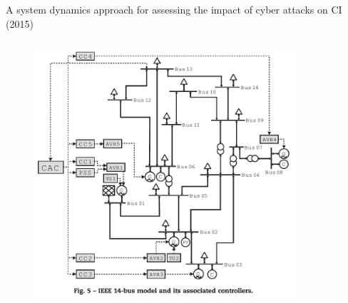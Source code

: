 \documentclass[compress]{beamer}
\begin{document}
\begin{frame}{A system dynamics approach for assessing the impact of cyber attacks on CI (2015)}
    \begin{columns}
     \begin{column}{0.55\textwidth}
      \begin{figure}
      \centering
      \includegraphics[width=1.0\textwidth]{./images/ieee-14-bus.png}
      \label{fig:ieee-14-bus}
      \end{figure}
     \end{column}
     \begin{column}{0.45\textwidth}
      \begin{figure}
      \centering

\end{figure}
\end{column}
\end{columns}
\end{frame}
\end{document}
